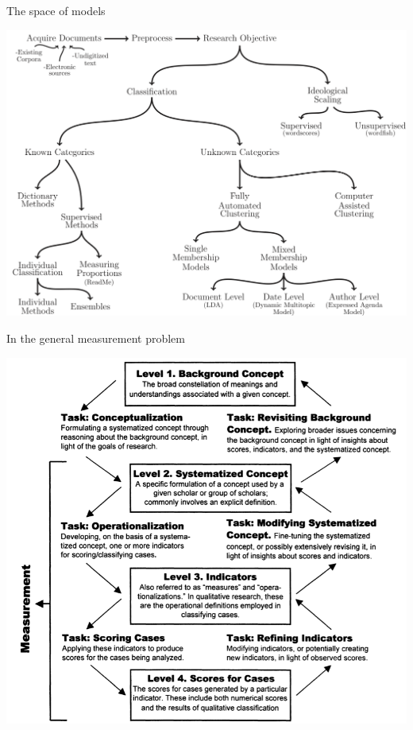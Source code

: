 \documentclass{hertieteaching}\usepackage[]{graphicx}\usepackage[]{color}
\begin{document}
\begin{frame}{The space of models}

\centerline{\includegraphics[scale=0.25]{pictures/tad-picture.png}}

\end{frame}

\begin{frame}{In the general measurement problem}

\centerline{\includegraphics[scale=0.25]{pictures/measurement-validity.png}}

\end{frame}
\end{document}
